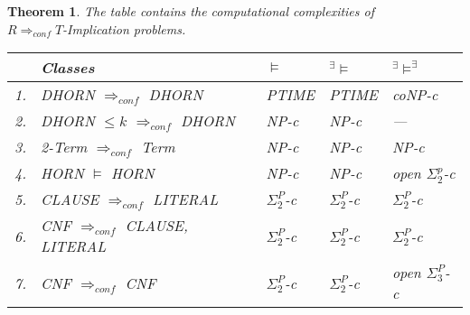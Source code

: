 \documentclass[12pt]{article}
\newcommand{\AM}{\mbox{$^\exists\!\!\models$}}
\newcommand{\AMB}{\mbox{$^\exists\!\!\models^\exists$}}
\newtheorem{theorem}{Theorem}[section]
\begin{document}
\begin{theorem}
The table contains the computational complexities of\\ $R \Longrightarrow_{conf} T$-Implication problems.\\
\begin{tabular}{|l|l|l|l|l|}
\hline
 & {\em Classes} &  $\models$ & \AM & \AMB \\ \hline
1. & DHORN $\Rightarrow_{conf}$ DHORN          & PTIME & PTIME  & coNP-c         \\ \hline
2. & DHORN $\leq k$ $\Rightarrow_{conf}$ DHORN & NP-c  & NP-c   & ---         \\ \hline
3. & 2-Term $\Rightarrow_{conf}$ Term          & NP-c  & NP-c   & NP-c           \\ \hline
4. & HORN $\models$ HORN                       & NP-c  & NP-c   & open $\Sigma^p_2$-c \\ \hline
5. & CLAUSE $\Rightarrow_{conf}$ LITERAL       & $\Sigma_2^P$-c & $\Sigma_2^P$-c & $\Sigma_2^P$-c \\ \hline
6. & CNF $\Rightarrow_{conf}$ CLAUSE, LITERAL  & $\Sigma_2^P$-c & $\Sigma_2^P$-c & $\Sigma_2^P$-c \\ \hline
7. & CNF $\Rightarrow_{conf}$ CNF              & $\Sigma_2^P$-c & $\Sigma_2^P$-c & open $\Sigma_3^P$-c \\ \hline
\end{tabular}
\end{theorem}






\color{black}




\vspace*{5mm}
\end{document}
